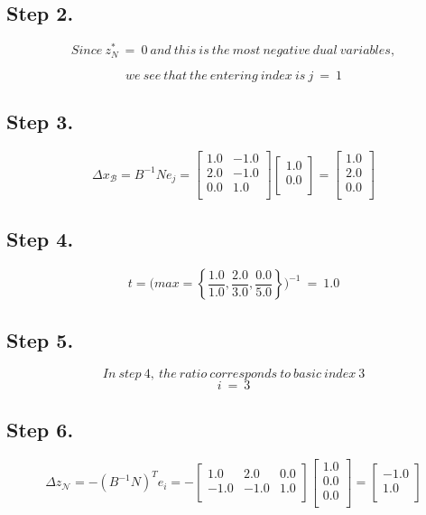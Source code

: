 \documentclass [12pt] {article}
\begin{document}
\subsection{Step 2.}
\[
Since\ z_\mathit{N}^*\ = \ 0\ and\ this\ is\ the\ most\ negative\ dual\ variables,
\]

\[
we\ see\ that\ the\ entering\ index\ is\  j\ =\ 1
\]
\subsection{Step 3.}
\[
\Delta x_{\mathcal B} = B^{-1} N e_j =
\begin{bmatrix}
1.0 & -1.0 \\ 2.0 & -1.0 \\ 0.0 & 1.0 \\ 
\end{bmatrix}
\begin{bmatrix}
1.0 \\ 0.0 \\ 
\end{bmatrix}
= \begin{bmatrix}
1.0 \\ 2.0 \\ 0.0 \\ 
\end{bmatrix}
\]
\subsection{Step 4.}
\[
t =\Bigg(
max= \left\{\frac{1.0}{1.0},\frac{2.0}{3.0},\frac{0.0}{5.0}\right\}
\Bigg)^{-1}\ =\ 1.0
\]
\subsection{Step 5.}
\[
In\ step\ 4, \ the\ ratio\ corresponds\ to\ basic\ index\ 3
\]
\[
i\ = \ 3
\]
\subsection{Step 6.}
\[
\Delta z_{\mathcal N}= -( B^{-1} N )^{T}e_i = -\begin{bmatrix}
1.0 & 2.0 & 0.0 \\ -1.0 & -1.0 & 1.0 \\ 
\end{bmatrix}
\begin{bmatrix}
1.0 \\ 0.0 \\ 0.0 \\ 
\end{bmatrix}
= \begin{bmatrix}
-1.0 \\ 1.0 \\ 
\end{bmatrix}
\]
\end{document}
